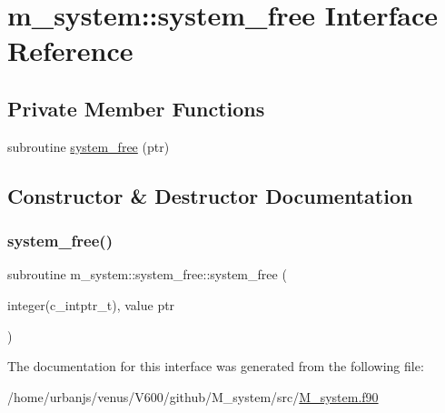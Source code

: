 \hypertarget{interfacem__system_1_1system__free}{}\section{m\+\_\+system\+:\+:system\+\_\+free Interface Reference}
\label{interfacem__system_1_1system__free}
\subsection*{Private Member Functions}
\begin{DoxyCompactItemize}
\item 
subroutine \mbox{\hyperlink{interfacem__system_1_1system__free_a8b548aad7ec6e740f0bcb626cca6d1e8}{system\+\_\+free}} (ptr)
\end{DoxyCompactItemize}


\subsection{Constructor \& Destructor Documentation}
\mbox{\label{interfacem__system_1_1system__free_a8b548aad7ec6e740f0bcb626cca6d1e8}} 
\subsubsection{\texorpdfstring{system\+\_\+free()}{system\_free()}}
{\footnotesize\ttfamily subroutine m\+\_\+system\+::system\+\_\+free\+::system\+\_\+free (\begin{DoxyParamCaption}\item[{integer(c\+\_\+intptr\+\_\+t), value}]{ptr }\end{DoxyParamCaption})\hspace{0.3cm}{\ttfamily [private]}}



The documentation for this interface was generated from the following file\+:\begin{DoxyCompactItemize}
\item 
/home/urbanjs/venus/\+V600/github/\+M\+\_\+system/src/\mbox{\hyperlink{M__system_8f90}{M\+\_\+system.\+f90}}\end{DoxyCompactItemize}
